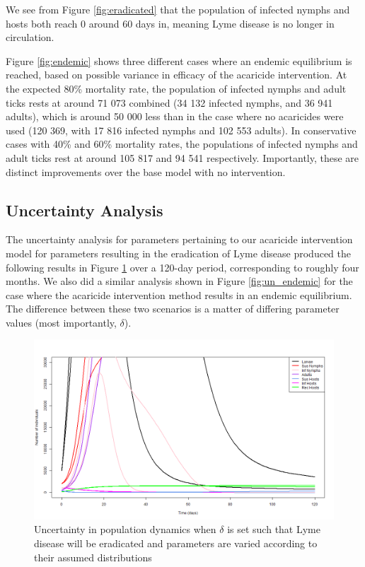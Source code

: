 \documentclass[12pt, centerh1]{article}
\begin{document}
We see from Figure \ref{fig:eradicated} that the population of infected nymphs and hosts both reach 0 around 60 days in, meaning Lyme disease is no longer in circulation. 

Figure \ref{fig:endemic} shows three different cases where an endemic equilibrium is reached, based on possible variance in efficacy of the acaricide intervention. At the expected 80\% mortality rate, the population of infected nymphs and adult ticks rests at around 71 073 combined (34 132 infected nymphs, and 36 941 adults), which is around 50 000 less than in the case where no acaricides were used (120 369, with 17 816 infected nymphs and 102 553 adults). In conservative cases with 40\% and 60\% mortality rates, the populations of infected nymphs and adult ticks rest at around 105 817 and 94 541 respectively. Importantly, these are distinct improvements over the base model with no intervention.

\subsection{Uncertainty Analysis}
The uncertainty analysis for parameters pertaining to our acaricide intervention model for parameters resulting in the eradication of Lyme disease produced the following results in Figure \ref{fig:un_eradicated} over a 120-day period, corresponding to roughly four months. We also did a similar analysis shown in Figure \ref{fig:un_endemic} for the case where the acaricide intervention method results in an endemic equilibrium. The difference between these two scenarios is a matter of differing parameter values (most importantly, $\delta$).

\begin{figure}[h]
    \centering
    \includegraphics[scale = 0.4]{figures/uncertainty_eradicated.png}
    \caption{Uncertainty in population dynamics when $\delta$ is set such that Lyme disease will be eradicated and parameters are varied according to their assumed distributions}
    \label{fig:un_eradicated}
\end{figure}
\end{document}
